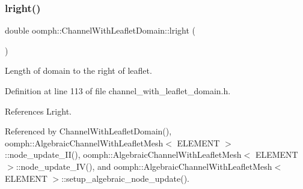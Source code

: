 \mbox{\label{classoomph_1_1ChannelWithLeafletDomain_aee74846110e70cd5538386e1ccb0ce7c}} 
\subsubsection{\texorpdfstring{lright()}{lright()}}
{\footnotesize\ttfamily double oomph\+::\+Channel\+With\+Leaflet\+Domain\+::lright (\begin{DoxyParamCaption}{ }\end{DoxyParamCaption})\hspace{0.3cm}{\ttfamily [inline]}}



Length of domain to the right of leaflet. 



Definition at line 113 of file channel\+\_\+with\+\_\+leaflet\+\_\+domain.\+h.



References Lright.



Referenced by Channel\+With\+Leaflet\+Domain(), oomph\+::\+Algebraic\+Channel\+With\+Leaflet\+Mesh$<$ E\+L\+E\+M\+E\+N\+T $>$\+::node\+\_\+update\+\_\+\+I\+I(), oomph\+::\+Algebraic\+Channel\+With\+Leaflet\+Mesh$<$ E\+L\+E\+M\+E\+N\+T $>$\+::node\+\_\+update\+\_\+\+I\+V(), and oomph\+::\+Algebraic\+Channel\+With\+Leaflet\+Mesh$<$ E\+L\+E\+M\+E\+N\+T $>$\+::setup\+\_\+algebraic\+\_\+node\+\_\+update().

\mbox{\label{classoomph_1_1ChannelWithLeafletDomain_ac0bc6edb7d09bfdb310de99f846f5093}} 
